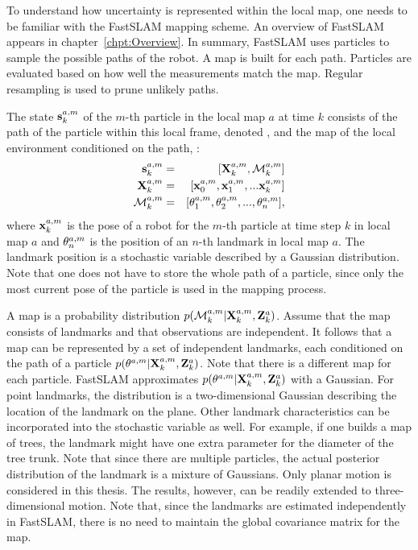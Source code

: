 To understand how uncertainty is represented within the local map, one
needs to be familiar with the FastSLAM \cite{Montemerlo2003} mapping
scheme.
An overview of FastSLAM appears in
chapter~\ref{chpt:Overview}. In summary, FastSLAM uses particles to
sample the possible paths of the robot. A map is built for each
path. Particles are evaluated based on how well the measurements match
the map.  Regular resampling is used to prune unlikely paths.

The state $\s{k}{a}{m}$ of the $m$-th particle in the local map $a$
at time $k$ consists of the path of the particle within this local
frame, denoted , and the map of the local environment
conditioned on the path, :
\begin{eqnarray}
 \s{k}{a}{m}    &=& [\Xall{k}{a}{m}, \map{k}{a}{m} ] \nonumber \\ 
 \Xall{k}{a}{m} &=& [\x{0}{a}{m}, \x{1}{a}{m}, ... \x{k}{a}{m}] \nonumber \\ 
 \map{k}{a}{m}  &=& [\mape{a}{m}{1}, \mape{a}{m}{2}, ..., \mape{a}{m}{n}], \nonumber
\end{eqnarray}
where $\x{k}{a}{m}$ is the pose of a robot for the $m$-th particle at
time step $k$ in local map $a$ and $\mape{a}{m}{n}$ is the position of
an $n$-th landmark in local map $a$. The landmark position is a
stochastic variable described by a Gaussian distribution. Note that
one does not have to store the whole path of a particle, since only
the most current pose of the particle is used in the mapping process.

A map is a probability distribution
$p(\map{k}{a}{m}|\Xall{k}{a}{m},\Zall{k}{a})$. Assume that the map
consists of landmarks and that observations are independent. It
follows that a map can be represented by a set of independent
landmarks, each conditioned on the path of a particle
$p(\mape{a}{m}{}|\Xall{k}{a}{m},\Zall{k}{a})$. Note that there is a
different map for each particle. FastSLAM approximates
$p(\mape{a}{m}{}|\Xall{k}{a}{m},\Zall{k}{a})$ with a Gaussian.  For
point landmarks, the distribution is a two-dimensional Gaussian
describing the location of the landmark on the plane. Other landmark
characteristics can be incorporated into the stochastic variable as
well. For example, if one builds a map of trees, the landmark might
have one extra parameter for the diameter of the tree trunk.  Note
that since there are multiple particles, the actual posterior
distribution of the landmark is a mixture of Gaussians.  Only planar
motion is considered in this thesis. The results, however, can be
readily extended to three-dimensional motion. Note that, since the
landmarks are estimated independently in FastSLAM, there is no need to
maintain the global covariance matrix for the map.

